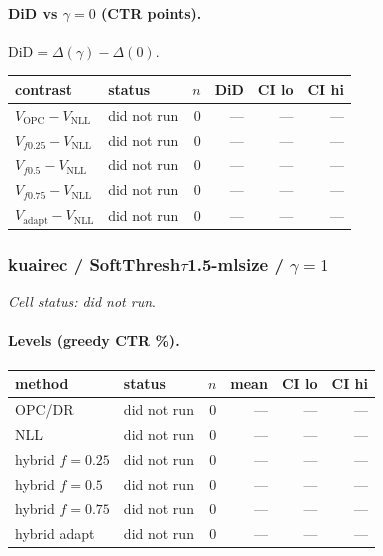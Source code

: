 \documentclass[10pt,a4paper]{article}
\begin{document}
\paragraph{DiD vs $\gamma=0$ (CTR points).} $\mathrm{DiD}=\Delta(\gamma)-\Delta(0)$.
{\centering\small\begin{tabular}{llrrrr}
\toprule contrast & status & $n$ & DiD & CI lo & CI hi \\
\midrule
$V_{\mathrm{OPC}}-V_{\mathrm{NLL}}$ & did not run & 0 & --- & --- & --- \\
$V_{f0.25}-V_{\mathrm{NLL}}$ & did not run & 0 & --- & --- & --- \\
$V_{f0.5}-V_{\mathrm{NLL}}$ & did not run & 0 & --- & --- & --- \\
$V_{f0.75}-V_{\mathrm{NLL}}$ & did not run & 0 & --- & --- & --- \\
$V_{\mathrm{adapt}}-V_{\mathrm{NLL}}$ & did not run & 0 & --- & --- & --- \\
\bottomrule\end{tabular}\par}
\bigskip
\subsubsection{kuairec / SoftThresh$\tau$1.5-mlsize / $\gamma=1$}
\emph{Cell status: did not run}.
\paragraph{Levels (greedy CTR \%).}
{\centering\small\begin{tabular}{llrrrr}
\toprule method & status & $n$ & mean & CI lo & CI hi \\
\midrule
OPC/DR & did not run & 0 & --- & --- & --- \\
NLL & did not run & 0 & --- & --- & --- \\
hybrid $f{=}0.25$ & did not run & 0 & --- & --- & --- \\
hybrid $f{=}0.5$ & did not run & 0 & --- & --- & --- \\
hybrid $f{=}0.75$ & did not run & 0 & --- & --- & --- \\
hybrid adapt & did not run & 0 & --- & --- & --- \\
\bottomrule\end{tabular}\par}
\end{document}
